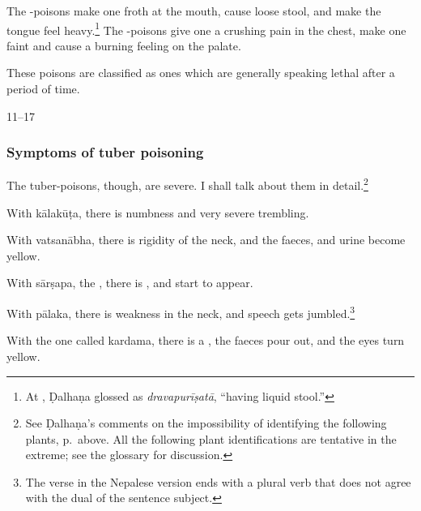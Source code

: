 \begin{translation}
    
The -poisons make one froth at the mouth,  cause
loose stool, and make the tongue feel heavy.\footnote{At
    , Ḍalhaṇa glossed  as
    \emph{dravapurīṣatā}, “having liquid stool.” }  The
    -poisons give one a crushing pain in the chest,
    make one faint and cause a burning feeling on the palate.
    
    These poisons
    are classified as ones which are generally speaking lethal after a period of time.
    
    \item[11--17]
    
    \subsubsection{Symptoms of tuber poisoning} The tuber-poisons,
though, are severe.  I shall talk about them in
detail.\footnote{See Ḍalhaṇa's comments on the impossibility of
    identifying the following plants, p.\,\pageref{kiratas} above. 
    All the following plant identifications are tentative in the
    extreme; see the glossary for discussion.}
    
    
    With
    \gls{kālakūṭa},
 there is numbness and very severe trembling.

%
    With
    \gls{vatsanābha},
there is rigidity of the neck, and the faeces,
    and urine become yellow.
    
With \gls{sārṣapa}, 
the , there is
, and  start to appear.

With \gls{pālaka}, %
there is weakness in the neck, and speech gets jumbled.\footnote{The
    verse in the Nepalese version ends with a plural verb that does not
    agree with the dual of the sentence subject.}
    
With the one called \gls{kardama}, there is a
, the faeces pour out, and  the eyes turn
yellow. 


\end{translation}
